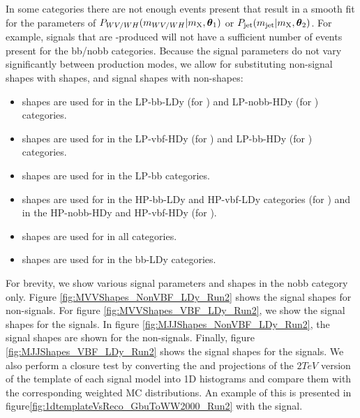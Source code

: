 In some categories there are not enough events present that result in a smooth fit for the parameters of $P_{WV/WH}(m_{WV/WH}|m_\mathrm{X},\vb*{\theta}_1)$ or $P_\mathrm{jet}(m_\mathrm{jet}|m_\mathrm{X},\vb*{\theta}_2)$.
For example, signals that are \VBF-produced will not have a sufficient number of events present for the bb/nobb categories.
Because the signal parameters do not vary significantly between production modes, we allow for substituting non-\VBF signal shapes with \VBF shapes, and \VBF signal shapes with non-\VBF shapes:
\begin{itemize}
  \item \DY\WprtoWZ shapes are used for \VBF\WprtoWZ in the LP-bb-LDy (for \MJ) and LP-nobb-HDy (for \MVV) categories.
  \item \VBF\WprtoWZ shapes are used for \DY\WprtoWZ in the LP-vbf-HDy (for \MJ) and LP-bb-HDy (for \MVV) categories.
  \item \ggF\RadtoWW shapes are used for \VBF\RadtoWW in the LP-bb categories.
  \item \ggF\GBulktoWW shapes are used for \VBF\GBulktoWW in the HP-bb-LDy and HP-vbf-LDy categories (for \MJ) and in the HP-nobb-HDy and HP-vbf-HDy (for \MVV).
  \item \ggF\GBulktoWW shapes are used for \DY\ZprtoWW in all categories.
  \item \ggF\GBulktoWW shapes are used for \VBF\ZprtoWW in the bb-LDy categories.
\end{itemize}

For brevity, we show various signal parameters and shapes in the nobb category only.
Figure \ref{fig:MVVShapes_NonVBF_LDy_Run2} shows the \MVV signal shapes for non-\VBF signals.
For figure \ref{fig:MVVShapes_VBF_LDy_Run2}, we show the \MVV signal shapes for the \VBF signals.
In figure \ref{fig:MJJShapes_NonVBF_LDy_Run2}, the \MJ signal shapes are shown for the non-\VBF signals.
Finally, figure \ref{fig:MJJShapes_VBF_LDy_Run2} shows the \MJ signal shapes for the \VBF signals.
We also perform a closure test by converting the \MVV and \MJ projections of the $2\unit{TeV}$ version of the template of each signal model into 1D histograms and compare them with the corresponding weighted MC distributions.
An example of this is presented in figure\ref{fig:1dtemplateVsReco_GbuToWW2000_Run2} with the \DY\GBulktoWW signal.

